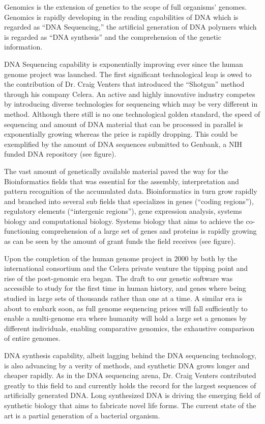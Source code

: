 \documentclass[letter,11pt]{article}
\begin{document}
Genomics is the extension of genetics to the scope of full organisms' genomes.
Genomics is rapidly developing in the reading capabilities of DNA which is
regarded as ``DNA Sequencing,'' the artificial generation of DNA polymers which
is regarded as ``DNA synthesis'' and the comprehension of the genetic
information.
 
DNA Sequencing capability is exponentially improving ever since the human
genome project was launched. The first significant technological leap is owed
to the contribution of Dr. Craig Venters that introduced the ``Shotgun'' method
through his company Celera. An active and highly innovative industry competes
by introducing diverse technologies for sequencing which may be very different
in method. Although there still is no one technological golden standard, the
speed of sequencing and amount of DNA material that can be processed in
parallel is exponentially growing whereas the price is rapidly dropping. This
could be exemplified by the amount of DNA sequences submitted to Genbank, a NIH
funded DNA repository (see figure).

The vast amount of genetically available material paved the way for the
Bioinformatics fields that was essential for the assembly, interpretation and
pattern recognition of the accumulated data. Bioinformatics in turn grow
rapidly and branched into several sub fields that specializes in genes (``coding
regions''), regulatory elements (``intergenic regions''), gene expression
analysis, systems biology and computational biology. Systems biology that aims
to achieve the co-functioning comprehension of a large set of genes and
proteins is rapidly growing as can be seen by the amount of grant funds the
field receives (see figure).
 
Upon the completion of the human genome project in 2000 by both by the
international consortium and the Celera private venture the tipping point and
rise of the post-genomic era began. The draft to our genetic software was
accessible to study for the first time in human history, and genes where being
studied in large sets of thousands rather than one at a time.  A similar era is
about to embark soon, as full genome sequencing prices will fall sufficiently
to enable a multi-genome era where humanity will hold a large set a genomes by
different individuals, enabling comparative genomics, the exhaustive comparison
of entire genomes.
 
DNA synthesis capability, albeit lagging behind the DNA sequencing technology,
is also advancing by a verity of methods, and synthetic DNA grows longer and
cheaper rapidly. As in the DNA sequencing arena, Dr. Craig Venters contributed
greatly to this field to and currently holds the record for the largest
sequences of artificially generated DNA.  Long synthesized DNA is driving the
emerging field of synthetic biology that aims to fabricate novel life forms.
The current state of the art is a partial generation of a bacterial organism.
 
\end{document}
